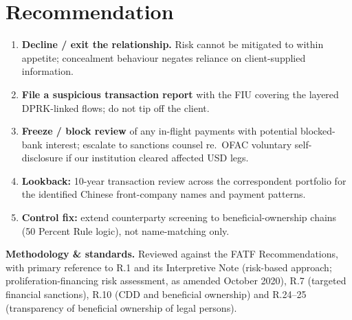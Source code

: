 \documentclass[10.5pt]{article}
\begin{document}
\section{Recommendation}
\begin{enumerate}
\item \textbf{Decline / exit the relationship.} Risk cannot be mitigated to within appetite; concealment behaviour negates reliance on client-supplied information.
\item \textbf{File a suspicious transaction report} with the FIU covering the layered DPRK-linked flows; do not tip off the client.
\item \textbf{Freeze / block review} of any in-flight payments with potential blocked-bank interest; escalate to sanctions counsel re.\ OFAC voluntary self-disclosure if our institution cleared affected USD legs.
\item \textbf{Lookback:} 10-year transaction review across the correspondent portfolio for the identified Chinese front-company names and payment patterns.
\item \textbf{Control fix:} extend counterparty screening to beneficial-ownership chains (50 Percent Rule logic), not name-matching only.
\end{enumerate}

{\footnotesize
\textbf{Methodology \& standards.} Reviewed against the FATF Recommendations, with primary reference to R.1 and its Interpretive Note (risk-based approach; proliferation-financing risk assessment, as amended October 2020), R.7 (targeted financial sanctions), R.10 (CDD and beneficial ownership) and R.24--25 (transparency of beneficial ownership of legal persons).
}
\end{document}
